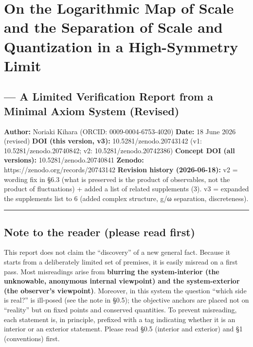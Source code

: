 \documentclass[11pt]{ltjsarticle}
\begin{document}
\section{On the Logarithmic Map of Scale and the Separation of Scale and
Quantization in a High-Symmetry
Limit}\label{on-the-logarithmic-map-of-scale-and-the-separation-of-scale-and-quantization-in-a-high-symmetry-limit}

\subsection{--- A Limited Verification Report from a Minimal Axiom
System
(Revised)}\label{a-limited-verification-report-from-a-minimal-axiom-system-revised}

\textbf{Author:} Noriaki Kihara (ORCID: 0009-0004-6753-4020)
\textbf{Date:} 18 June 2026 (revised) \textbf{DOI (this version, v3):}
10.5281/zenodo.20743142 (v1: 10.5281/zenodo.20740842; v2:
10.5281/zenodo.20742386) \textbf{Concept DOI (all versions):}
10.5281/zenodo.20740841 \textbf{Zenodo:}
https://zenodo.org/records/20743142 \textbf{Revision history
(2026-06-18):} v2 = wording fix in §6.3 (what is preserved is the
product of observables, not the product of fluctuations) + added a list
of related supplements (3). v3 = expanded the supplements list to 6
(added complex structure, g/ω separation, discreteness).

\begin{center}\rule{0.5\linewidth}{0.5pt}\end{center}

\subsection{Note to the reader (please read
first)}\label{note-to-the-reader-please-read-first}

This report does not claim the ``discovery'' of a new general fact.
Because it starts from a deliberately limited set of premises, it is
easily misread on a first pass. Most misreadings arise from
\textbf{blurring the system-interior (the unknowable, anonymous internal
viewpoint) and the system-exterior (the observer's viewpoint)}.
Moreover, in this system the question ``which side is real?'' is
ill-posed (see the note in §0.5); the objective anchors are placed not
on ``reality'' but on fixed points and conserved quantities. To prevent
misreading, each statement is, in principle, prefixed with a tag
indicating whether it is an interior or an exterior statement. Please
read §0.5 (interior and exterior) and §1 (conventions) first.
\end{document}

